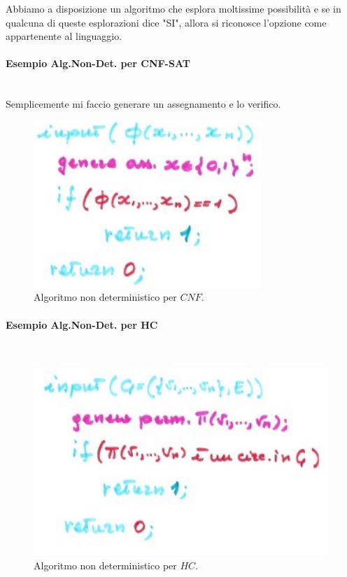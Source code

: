 \documentclass{article}
\begin{document}
Abbiamo a disposizione un algoritmo che esplora moltissime possibilità e se in qualcuna
di queste esplorazioni dice "SI", allora si riconosce l'opzione come appartenente
al linguaggio.

\paragraph{Esempio Alg.Non-Det. per CNF-SAT}\mbox{}\\
Semplicemente mi faccio generare un assegnamento e lo verifico.
\begin{figure}[H]
    \centering
    \includegraphics[scale=0.6]{images/CNFndet.png}
    \caption{Algoritmo non deterministico per $CNF$.}
\end{figure}

\paragraph{Esempio Alg.Non-Det. per HC}\mbox{}\\
\begin{figure}[H]
    \centering
    \includegraphics[scale=0.6]{images/HCndet.png}
    \caption{Algoritmo non deterministico per $HC$.}
\end{figure}
\end{document}
